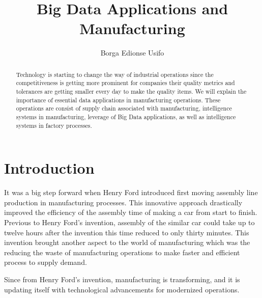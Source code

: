 \documentclass[sigconf]{acmart}
\begin{document}
\title{Big Data Applications and Manufacturing}

\author{Borga Edionse Usifo}

\renewcommand{\shortauthors}{B. Usifo et al.}

\begin{abstract}
Technology is starting to change the way of industrial operations since the competitiveness is getting more prominent for companies their quality metrics and tolerances are getting smaller every day to make the quality items. We will explain the importance of essential data applications in manufacturing operations. These operations are consist of supply chain associated with manufacturing, intelligence systems in manufacturing, leverage of Big Data applications, as well as intelligence systems in factory processes.
\end{abstract}


\maketitle

\section{Introduction}

It was a big step forward when Henry Ford introduced first moving assembly line production in manufacturing processes.\cite{www-ford} This innovative approach drastically improved the efficiency of the assembly time of making a car from start to finish.\cite{www-history} Previous to Henry Ford's invention, assembly of the similar car could take up to twelve hours after the invention this time reduced to only thirty minutes\cite{www-history}. This invention brought another aspect to the world of manufacturing which was the reducing the waste of manufacturing operations to make faster and efficient process to supply demand\cite{www-industryweek}.

\par Since from Henry Ford's invention, manufacturing is transforming, and it is updating itself with technological advancements for modernized operations. 
\end{document}
